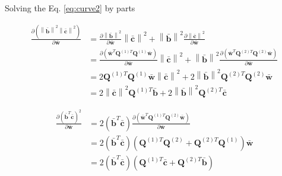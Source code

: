 Solving \cite[pp. 11]{petersen2008matrix} the Eq. \ref{eq:curve2} by parts

\begin{align}
\frac{
\partial 
\left(
\left\|\mathbf{\bar{b}}\right\|^2
\left\|\mathbf{\bar{c}}\right\|^2
\right)
}
{\partial \mathbf{\bar{w}}}
&=
\frac{
\partial 
\left\|\mathbf{\bar{b}}\right\|^2
}
{\partial \mathbf{\bar{w}}}
\left\|\mathbf{\bar{c}}\right\|^2
+
\left\|\mathbf{\bar{b}}\right\|^2
\frac{
\partial 
\left\|\mathbf{\bar{c}}\right\|^2
}
{\partial \mathbf{\bar{w}}}\\
~
&=
\frac{
\partial 
\left(
\mathbf{\bar{w}}^{T} \mathbf{Q}^{(1)T}
\mathbf{Q}^{(1)} \mathbf{\bar{w}}
\right)
}
{\partial \mathbf{\bar{w}}}
\left\|\mathbf{\bar{c}}\right\|^2
+
\left\|\mathbf{\bar{b}}\right\|^2
\frac{
\partial 
\left(
\mathbf{\bar{w}}^{T} \mathbf{Q}^{(2)T}
\mathbf{Q}^{(2)} \mathbf{\bar{w}}
\right)
}
{\partial \mathbf{\bar{w}}}\\
~
&=
2
\mathbf{Q}^{(1)T} \mathbf{Q}^{(1)} \mathbf{\bar{w}}
\left\|\mathbf{\bar{c}}\right\|^2
+
2
\left\|\mathbf{\bar{b}}\right\|^2
\mathbf{Q}^{(2)T} \mathbf{Q}^{(2)} \mathbf{\bar{w}}\\
~
&=
2
\left\|\mathbf{\bar{c}}\right\|^2
\mathbf{Q}^{(1)T} \mathbf{\bar{b}}
+
2
\left\|\mathbf{\bar{b}}\right\|^2
\mathbf{Q}^{(2)T} \mathbf{\bar{c}}
\end{align}

\begin{align}
\frac{
\partial
\left(
\mathbf{\bar{b}}^{T}
\mathbf{\bar{c}}
\right)^{2}
}
{\partial \mathbf{\bar{w}}} 
&=
2
\left(
\mathbf{\bar{b}}^{T}
\mathbf{\bar{c}}
\right)
\frac{
\partial
\left(
\mathbf{\bar{w}}^{T} \mathbf{Q}^{(1)T}
\mathbf{Q}^{(2)} \mathbf{\bar{w}}
\right)
}
{\partial \mathbf{\bar{w}}}\\
~
&=
2
\left(
\mathbf{\bar{b}}^{T}
\mathbf{\bar{c}}
\right)
\left(
\mathbf{Q}^{(1)T}\mathbf{Q}^{(2)}
+
\mathbf{Q}^{(2)T}\mathbf{Q}^{(1)}
\right)
\mathbf{\bar{w}}\\
~
&=
2
\left(
\mathbf{\bar{b}}^{T}
\mathbf{\bar{c}}
\right)
\left(
\mathbf{Q}^{(1)T}\mathbf{\bar{c}}
+
\mathbf{Q}^{(2)T}\mathbf{\bar{b}}
\right)
\end{align}


